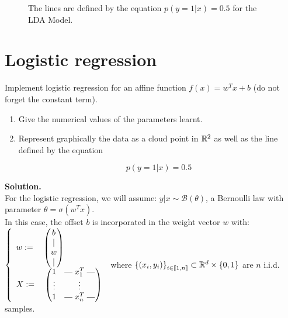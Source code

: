 \documentclass[a4paper, 11pt]{report}
\newcommand{\rotvert}{\rotatebox[origin=c]{90}{$\vert$}}
\begin{document}
\begin{enumerate}[label=\alph*]
\begin{figure}[!htb]
          \label{fig:lda_c}
        \endminipage
        \vspace*{-.8cm}
        \caption{The lines are defined by the equation $p(y=1|x)=0.5$ for the LDA Model.}
        \label{fig:lda-plots}
        \end{figure}
\end{enumerate}

\section{Logistic regression}

Implement logistic regression for an affine function $f(x) = w^{T}x + b$ (do not forget the constant term).

\begin{enumerate}[label=\alph*]
    \item Give the numerical values of the parameters learnt.
    
    \item Represent graphically the data as a cloud point in $\mathbb{R}^{2}$ as well as the line defined by the equation
    
    \begin{equation*}
        p \left( y = 1 | x \right) = 0.5
    \end{equation*}
\end{enumerate}

\textbf{Solution.} \\

For the logistic regression, we will assume: $ y|x \sim \mathcal{B}(\theta)$, a Bernoulli law with parameter $\theta = \sigma(w^Tx) $. \\ 

In this case, the offset $b$ is incorporated in the weight vector $w$ with: $
    \left\{
        \begin{array}{ll}
            w := \quad
                    \begin{pmatrix} 
                    b \\
                    | \\
                    w \\
                    |
                    \end{pmatrix} \\
            X := \quad
                    \begin{pmatrix} 
                    1 & \protect\rotvert\; x_{1}^{T} \;\protect\rotvert \\
                    \vdots & \vdots \\
                    1 & \protect\rotvert\; x_{n}^{T} \;\protect\rotvert
                    \end{pmatrix} \\
        \end{array}
    \right.
    $ where $\left\{ \left( x_{i}, y_{i} \right) \right\}_{i \in [\![ 1, n ]\!]} \subset \mathbb{R}^{d} \times \left\{ 0, 1 \right\}$ are $n$ i.i.d. samples.
    
\end{document}
